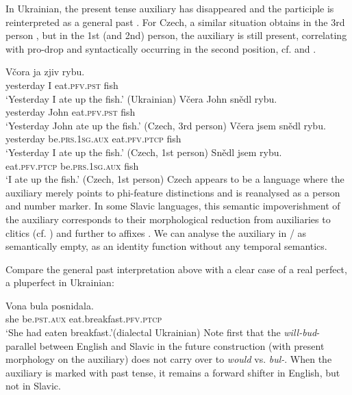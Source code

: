\documentclass[output=paper,colorlinks,citecolor=brown]{langscibook}
\begin{document}
In Ukrainian, the present tense auxiliary has disappeared and the participle is reinterpreted as a general past . For Czech, a similar situation obtains in the 3rd person , but in  the 1st (and 2nd) person, the auxiliary is still present, correlating with pro-drop and syntactically occurring in the second position, cf.  and .

\ea\ea\label{prus}\gll
Včora ja zjiv rybu.\\
yesterday I eat.\textsc{pfv}.\textsc{pst} fish\\
\glt `Yesterday I ate up the fish.' \hfill (Ukrainian)
\ex\label{pch1}\gll 
Včera John snědl rybu. \\
yesterday John eat.\textsc{pfv}.\textsc{pst} fish\\
\glt `Yesterday John ate up the fish.' \hfill (Czech, 3rd person)
\ex\label{pch2}\gll 
Včera jsem snědl rybu.\\
yesterday be.\textsc{prs.1sg}.\textsc{aux}   eat.\textsc{pfv}.\textsc{ptcp} fish \\
\glt `Yesterday I ate up the fish.' \hfill (Czech, 1st person)
\ex\label{pch3}\gll 
Snědl jsem rybu.\\
eat.\textsc{pfv}.\textsc{ptcp} be.\textsc{prs.1sg}.\textsc{aux} fish \\
\glt `I ate up the fish.' \hfill (Czech, 1st person)
\z\z
Czech appears to be a language where 
 the auxiliary merely points to phi-feature distinctions and is
reanalysed as a person and number marker. In some Slavic languages, this semantic impoverishment of the auxiliary corresponds 
to their morphological reduction from auxiliaries to clitics (cf. ) and further to affixes \citep[47]{Migdalski2006}.
We can analyse the auxiliary in / as semantically empty, as an identity function without any temporal semantics. 

Compare the general past interpretation above with a clear case of a real perfect, a pluperfect in Ukrainian:

\ea\label{ukrpp}\gll Vona bula posnidala.\\
she be.\textsc{pst}.\textsc{aux} eat.breakfast.\textsc{pfv}.\textsc{ptcp}\\
\glt `She had eaten breakfast.’\hfill (dialectal Ukrainian)
\z
Note first that the {\textit{will-bud}}-parallel between English and Slavic in the future construction (with present morphology on the auxiliary) does not carry over to {\textit{would}} vs. {\textit{bul-}}. When the  auxiliary is marked with past tense, it remains a forward shifter in English, but not in Slavic.
\end{document}
